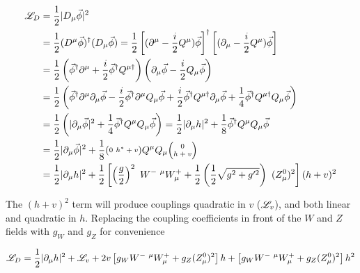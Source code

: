         \begin{equation} \begin{split}
            \Lag_D &= \frac{1}{2} |D_{\mu} \vec{\phi}|^2
                \\&= \frac{1}{2} (D^{\mu} \vec{\phi})^\dag (D_{\mu} \vec{\phi})
                    = \frac{1}{2} \left[(\partial^{\mu} - \frac{i}{2}Q^{\mu}) \vec{\phi}\right]^\dag
                    \left[(\partial_{\mu} - \frac{i}{2}Q^{\mu}) \vec{\phi}\right]
                \\&= \frac{1}{2} \left(\vec{\phi}^\dag \partial^{\mu} + \frac{i}{2} \vec{\phi}^\dag Q^{\mu \dag} \right)
                    \left(\partial_{\mu}\vec{\phi} - \frac{i}{2}Q_{\mu}\vec{\phi} \right)
                \\&= \frac{1}{2} \left(
                    \vec{\phi}^\dag \partial^{\mu} \partial_{\mu}\vec{\phi}
                    - \frac{i}{2} \vec{\phi}^\dag \partial^{\mu} Q_{\mu}\vec{\phi}
                    + \frac{i}{2} \vec{\phi}^\dag Q^{\mu \dag} \partial_{\mu}\vec{\phi}
                    + \frac{1}{4} \vec{\phi}^\dag Q^{\mu \dag} Q_{\mu}\vec{\phi}
                    \right)
                \\&= \frac{1}{2} \left(
                    | \partial_{\mu}\vec{\phi} |^2
                    + \frac{1}{4} \vec{\phi}^\dag Q^{\mu} Q_{\mu} \vec{\phi}
                    \right)
                    = \frac{1}{2} | \partial_{\mu}h |^2 + \frac{1}{8} \vec{\phi}^\dag Q^{\mu}Q_{\mu} \vec{\phi}
                \\&= \frac{1}{2} | \partial_{\mu}\vec{\phi} |^2 + \frac{1}{8} 
                        \minimatrix{0 & h^* + v} Q^{\mu}
                        Q_{\mu} \minimatrix{0 \\ h + v}
                \\&= \frac{1}{2} | \partial_{\mu}h |^2
                    + \frac{1}{2} \left[ \left(\frac{g}{2}\right)^2\  W^{-\ \mu} W^+_{\mu}
                    + \frac{1}{2} \left(\frac{1}{2}\sqrt{g^2 + g^{\prime 2}}\right)\ (Z^0_{\mu})^2 \right] (h+v)^2
        \end{split} \end{equation}

        The $(h+v)^2$ term will produce couplings quadratic in $v$ ($\mathscr{L}_v$), and both linear and quadratic in $h$.
        Replacing the coupling coefficients in front of the $W$ and $Z$ fields with $g_W$ and $g_Z$ for convenience

        \begin{equation} \begin{split}
            \mathscr{L}_D = \frac{1}{2} | \partial_{\mu}h |^2 + \mathscr{L}_v
                + 2v\left[ g_W W^{-\ \mu} W^+_{\mu} + g_Z (Z^0_{\mu})^2 \right] h
                + \left[ g_W W^{-\ \mu} W^+_{\mu} + g_Z (Z^0_{\mu})^2 \right] h^2
        \end{split} \end{equation}

